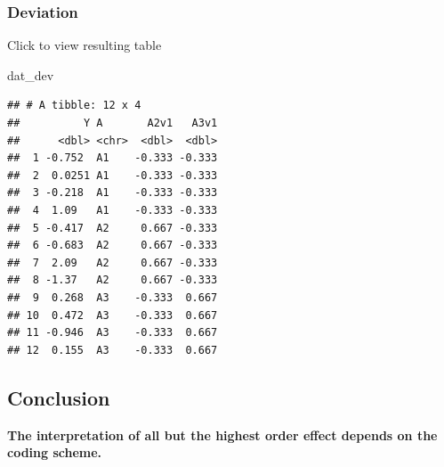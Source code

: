 \documentclass[]{book}
\newenvironment{Shaded}{\begin{snugshade}}{\end{snugshade}}
\newcommand{\CommentTok}[1]{\textcolor[rgb]{0.56,0.35,0.01}{\textit{#1}}}
\newcommand{\DataTypeTok}[1]{\textcolor[rgb]{0.13,0.29,0.53}{#1}}
\newcommand{\DecValTok}[1]{\textcolor[rgb]{0.00,0.00,0.81}{#1}}
\newcommand{\KeywordTok}[1]{\textcolor[rgb]{0.13,0.29,0.53}{\textbf{#1}}}
\newcommand{\NormalTok}[1]{#1}
\newcommand{\OperatorTok}[1]{\textcolor[rgb]{0.81,0.36,0.00}{\textbf{#1}}}
\newcommand{\StringTok}[1]{\textcolor[rgb]{0.31,0.60,0.02}{#1}}
\begin{document}
\hypertarget{deviation-2}{%
\subsubsection{Deviation}\label{deviation-2}}

\begin{Shaded}
\end{Shaded}

Click to view resulting table

\begin{Shaded}
\begin{Highlighting}[]
\NormalTok{dat_dev}
\end{Highlighting}
\end{Shaded}

\begin{verbatim}
## # A tibble: 12 x 4
##          Y A       A2v1   A3v1
##      <dbl> <chr>  <dbl>  <dbl>
##  1 -0.752  A1    -0.333 -0.333
##  2  0.0251 A1    -0.333 -0.333
##  3 -0.218  A1    -0.333 -0.333
##  4  1.09   A1    -0.333 -0.333
##  5 -0.417  A2     0.667 -0.333
##  6 -0.683  A2     0.667 -0.333
##  7  2.09   A2     0.667 -0.333
##  8 -1.37   A2     0.667 -0.333
##  9  0.268  A3    -0.333  0.667
## 10  0.472  A3    -0.333  0.667
## 11 -0.946  A3    -0.333  0.667
## 12  0.155  A3    -0.333  0.667
\end{verbatim}

\hypertarget{conclusion}{%
\subsection{Conclusion}\label{conclusion}}

\textbf{The interpretation of all but the highest order effect depends on the coding scheme.}
\end{document}
